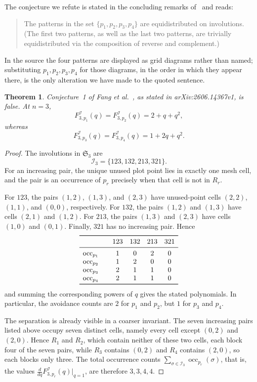 \documentclass[11pt]{amsart}
\newtheorem{theorem}{Theorem}
\theoremstyle{remark}
\newcommand{\occ}{\operatorname{occ}}
\begin{document}
The conjecture we refute is stated in the concluding remarks
of~\cite{FFKLSS26} and reads:
\begin{quote}
The patterns in the set $\{p_1,p_2,p_3,p_4\}$ are equidistributed on
involutions. (The first two patterns, as well as the last two patterns,
are trivially equidistributed via the composition of reverse and
complement.)
\end{quote}
In the source the four patterns are displayed as grid diagrams rather
than named; substituting $p_1,p_2,p_3,p_4$ for those diagrams, in the
order in which they appear there, is the only alteration we have made to
the quoted sentence.

\begin{theorem}
Conjecture~1 of Fang et al.~\cite{FFKLSS26}, as stated in
arXiv:2606.14367v1, is false. At $n=3$,
\[
 F^{\mathcal I}_{3,p_1}(q)
 =F^{\mathcal I}_{3,p_2}(q)
 =2+q+q^2,
\]
whereas
\[
 F^{\mathcal I}_{3,p_3}(q)
 =F^{\mathcal I}_{3,p_4}(q)
 =1+2q+q^2.
\]
\end{theorem}

\begin{proof}
The involutions in $\mathfrak S_3$ are
\[
 \mathcal I_3=\{123,132,213,321\}.
\]
For an increasing pair, the unique unused plot point lies in exactly
one mesh cell, and the pair is an occurrence of $p_r$ precisely when
that cell is not in $R_r$.

For $123$, the pairs $(1,2)$, $(1,3)$, and $(2,3)$ have unused-point
cells $(2,2)$, $(1,1)$, and $(0,0)$, respectively. For $132$, the
pairs $(1,2)$ and $(1,3)$ have cells $(2,1)$ and $(1,2)$. For $213$,
the pairs $(1,3)$ and $(2,3)$ have cells $(1,0)$ and $(0,1)$.
Finally, $321$ has no increasing pair. Hence
\[
\begin{array}{c@{\qquad}cccc}
\toprule
 &123&132&213&321\\
\midrule
\occ_{p_1}&1&0&2&0\\
\occ_{p_2}&1&2&0&0\\
\occ_{p_3}&2&1&1&0\\
\occ_{p_4}&2&1&1&0\\
\bottomrule
\end{array}
\]
and summing the corresponding powers of $q$ gives the stated
polynomials. In particular, the avoidance counts are $2$ for $p_1$
and $p_2$, but $1$ for $p_3$ and $p_4$.

The separation is already visible in a coarser invariant. The seven
increasing pairs listed above occupy seven distinct cells, namely every
cell except $(0,2)$ and $(2,0)$. Hence $R_1$ and $R_2$, which contain
neither of these two cells, each block four of the seven pairs, while
$R_3$ contains $(0,2)$ and $R_4$ contains $(2,0)$, so each blocks only
three. The total occurrence counts
$\sum_{\sigma\in\mathcal I_3}\occ_{p_r}(\sigma)$, that is, the values
$\frac{d}{dq}F^{\mathcal I}_{3,p_r}(q)\big|_{q=1}$, are therefore
$3,3,4,4$.
\end{proof}
\end{document}
